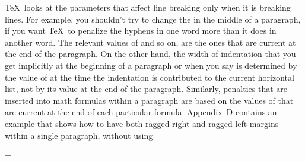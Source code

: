 \TeX\ looks at the parameters that affect
line breaking only when it is breaking lines. For example, you shouldn't
try to change the 
in the middle of a paragraph,
if you want \TeX\ to penalize the hyphens in one word more than it does in
another word. The relevant values of
and so on,
are the ones that are current at the end of the paragraph.
On the other hand, the width of indentation that you get
implicitly at the beginning of a paragraph or when you say 
is determined by the value of\/ 
at the time the
indentation is contributed to the current horizontal list,
not by its value at the end of the paragraph. Similarly, penalties
that are inserted into math formulas within a paragraph are based
on the values of\/ 
that are current
at the end of each particular formula. Appendix~D contains an example
that shows how to have both ragged-right and ragged-left margins within
a single paragraph, without using 

\newdimen\varunit \varunit=0.989pt %
=


